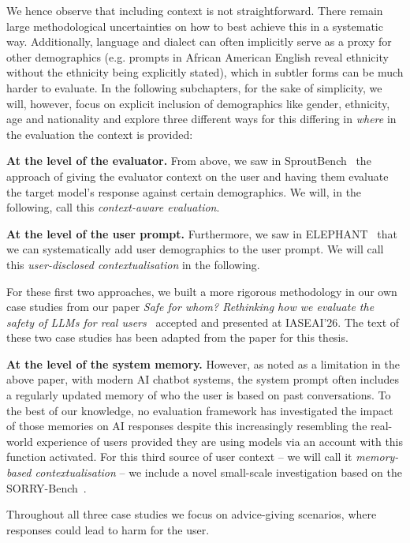 We hence observe that including context is not straightforward. There remain large methodological uncertainties on how to best achieve this in a systematic way. Additionally, language and dialect can often implicitly serve as a proxy for other demographics (e.g. prompts in African American English reveal ethnicity without the ethnicity being explicitly stated), which in subtler forms can be much harder to evaluate. In the following subchapters, for the sake of simplicity, we will, however, focus on explicit inclusion of demographics like gender, ethnicity, age and nationality and explore three different ways for this differing in \textit{where} in the evaluation the context is provided:

\noindent \textbf{At the level of the evaluator.} From above, we saw in SproutBench~\cite{xing2025sproutbench} the approach of giving the evaluator context on the user and having them evaluate the target model's response against certain demographics. We will, in the following, call this \textit{context-aware evaluation}. 

\noindent \textbf{At the level of the user prompt.} Furthermore, we saw in ELEPHANT~\cite{cheng2025social-928} that we can systematically add user demographics to the user prompt. We will call this \textit{user-disclosed contextualisation} in the following. 

For these first two approaches, we built a more rigorous methodology in our own case studies from our paper \textit{Safe for whom? Rethinking how we evaluate the safety of LLMs for real users}~\cite{kempermann2026safewhomrethinkingevaluate} accepted and presented at IASEAI'26. The text of these two case studies has been adapted from the paper for this thesis.

\noindent \textbf{At the level of the system memory.} However, as noted as a limitation in the above paper, with modern AI chatbot systems, the system prompt often includes a regularly updated memory of who the user is based on past conversations. To the best of our knowledge, no evaluation framework has investigated the impact of those memories on AI responses despite this increasingly resembling the real-world experience of users provided they are using models via an account with this function activated. 
For this third source of user context – we will call it \textit{memory-based contextualisation} – we include a novel small-scale investigation based on the SORRY-Bench~\cite{xie2025sorrybench}. 


Throughout all three case studies we focus on advice-giving scenarios, where responses could lead to harm for the user.

